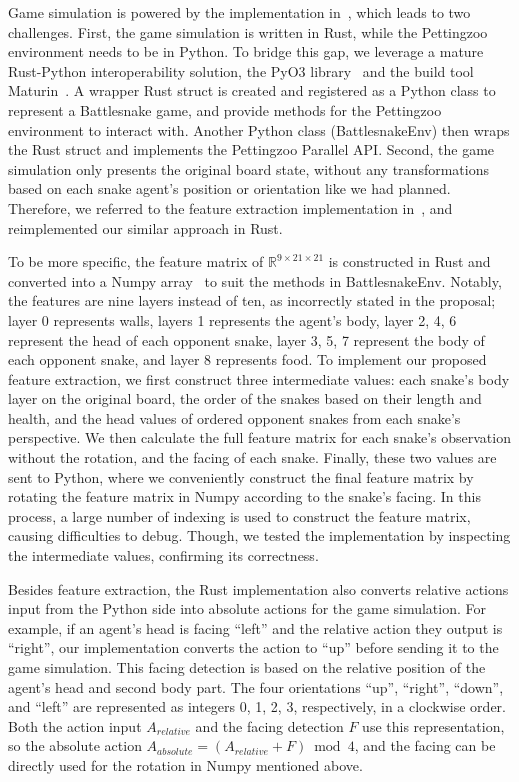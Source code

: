 \documentclass[a4paper]{article}
\begin{document}
Game simulation is powered by the implementation in~\cite{wrenger2024rusty},
which leads to two challenges. First, the game simulation is written in Rust,
while the Pettingzoo environment needs to be in Python. To bridge this gap,
we leverage a mature Rust-Python interoperability solution,
the PyO3 library~\cite{pyo3} and the build tool Maturin~\cite{maturin}.
A wrapper Rust struct is created and registered as a Python class to represent a
Battlesnake game,
and provide methods for the Pettingzoo environment to interact with.
Another Python class (\textsf{BattlesnakeEnv})
then wraps the Rust struct and implements the Pettingzoo Parallel API. Second,
the game simulation only presents the original board state,
without any transformations based on each snake agent's position or orientation
like we had planned. Therefore,
we referred to the feature extraction implementation
in~\cite{siddiqui2020multiagent},
and reimplemented our similar approach in Rust.

To be more specific,
the feature matrix of $\mathbb R^{9\times21\times21}$ is constructed in Rust and
converted into a Numpy array~\cite{harris2020array}
to suit the methods in \textsf{BattlesnakeEnv}. Notably,
the features are nine layers instead of ten,
as incorrectly stated in the proposal; layer 0 represents walls,
layers 1 represents the agent's body, layer 2, 4,
6 represent the head of each opponent snake, layer 3, 5,
7 represent the body of each opponent snake, and layer 8 represents food.
To implement our proposed feature extraction,
we first construct three intermediate values:
each snake's body layer on the original board,
the order of the snakes based on their length and health,
and the head values of ordered opponent snakes from each snake's perspective.
We then calculate the full feature matrix for each snake's observation without
the rotation, and the facing of each snake. Finally,
these two values are sent to Python,
where we conveniently construct the final feature matrix by rotating the feature
matrix in Numpy according to the snake's facing. In this process,
a large number of indexing is used to construct the feature matrix,
causing difficulties to debug. Though,
we tested the implementation by inspecting the intermediate values,
confirming its correctness.

Besides feature extraction,
the Rust implementation also converts relative actions input from the Python
side into absolute actions for the game simulation. For example,
if an agent's head is facing ``left'' and the relative action they output is
``right'',
our implementation converts the action to ``up'' before sending it to the game
simulation.
This facing detection is based on the relative position of the agent's head and
second body part. The four orientations ``up'', ``right'', ``down'',
and ``left'' are represented as integers 0, 1, 2, 3, respectively,
in a clockwise order.
Both the action input $A_{relative}$ and the facing detection $F$ use this representation,
so the absolute action $A_{absolute}=(A_{relative}+F)\bmod 4$,
and the facing can be directly used for the rotation in Numpy mentioned above.
\end{document}
